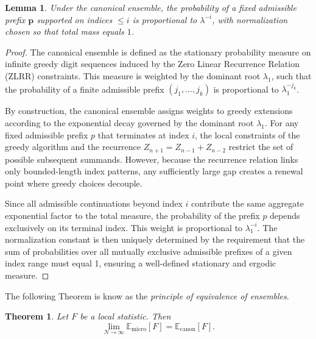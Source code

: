 \documentclass[11pt]{amsart}
\theoremstyle{plain}
\numberwithin{equation}{section} %
\newtheorem{theorem}[thm]{Theorem}
\newtheorem{lemma}[thm]{Lemma}
\numberwithin{table}{section} %
\numberwithin{figure}{section}
\begin{document}
	
	
	\begin{lemma}
		\label{lem:CanonicalPrefix}
		Under the canonical ensemble, the probability of a fixed admissible prefix
		$\mathbf{p}$ supported on indices $\le i$ is proportional to $\lambda^{-i}$,
		with normalization chosen so that total mass equals $1$.
	\end{lemma}
	
	\begin{proof}
		The canonical ensemble is defined as the stationary probability measure on infinite greedy digit sequences induced by the Zero Linear Recurrence Relation (ZLRR) constraints. This measure is weighted by the dominant root $\lambda_1$, such that the probability of a finite admissible prefix $(j_{1}, \dots, j_{k})$ is proportional to $\lambda_1^{-j_{k}}$.
		
		By construction, the canonical ensemble assigns weights to greedy extensions according to the exponential decay governed by the dominant root $\lambda_1$. For any fixed admissible prefix $p$ that terminates at index $i$, the local constraints of the greedy algorithm and the recurrence $Z_{n+1} = Z_{n-1} + Z_{n-2}$ restrict the set of possible subsequent summands. However, because the recurrence relation links only bounded-length index patterns, any sufficiently large gap creates a renewal point where greedy choices decouple.
		
		Since all admissible continuations beyond index $i$ contribute the same aggregate exponential factor to the total measure, the probability of the prefix $p$ depends exclusively on its terminal index. This weight is proportional to $\lambda_1^{-i}$. The normalization constant is then uniquely determined by the requirement that the sum of probabilities over all mutually exclusive admissible prefixes of a given index range must equal 1, ensuring a well-defined stationary and ergodic measure.
	\end{proof}
	
	The following Theorem is know as the \textit{principle of equivalence of ensembles}.
	
	\begin{theorem} 
		\label{thm:EquivalenceEnsembles}
		Let $F$ be a local statistic. Then
		\[
		\lim_{N\to\infty}
		\mathbb{E}_{\mathrm{micro}}[F]
		=
		\mathbb{E}_{\mathrm{canon}}[F].
		\]
	\end{theorem}
	
\end{document}
